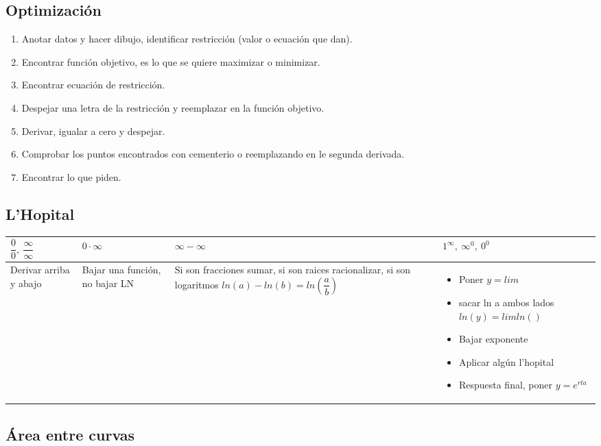\subsection{Optimización}

\begin{enumerate}
	\item Anotar datos y hacer dibujo, identificar restricción (valor o ecuación que dan).
	\item Encontrar función objetivo, es lo que se quiere maximizar o minimizar.
	\item Encontrar ecuación de restricción.
	\item Despejar una letra de la restricción y reemplazar en la función objetivo.
	\item Derivar, igualar a cero y despejar.
	\item Comprobar los puntos encontrados con cementerio o reemplazando en le segunda derivada.
	\item Encontrar lo que piden.
\end{enumerate}

\subsection{L'Hopital}

\begin{tabular}{@{}|p{2cm}| @{}|p{2cm}| @{}|p{2.5cm}| @{}|p{4cm}|}
	\hline \hline
	$\dfrac{0}{0},\ \dfrac{\infty}{\infty}$  & $0\cdot \infty$  & $\infty-\infty$ & $1^\infty,\ \infty^0,\ 0^0$ \\
	\hline
	Derivar arriba y abajo & Bajar una función, no bajar LN  & Si son fracciones sumar, si son raices racionalizar, si son logaritmos $ln(a)-ln(b)=ln(\dfrac{a}{b})$ & \begin{itemize}
		\item Poner $y=lim$
		\item sacar ln a ambos lados $ln(y)=lim ln()$
		\item Bajar exponente
		\item Aplicar algún l'hopital
		\item Respuesta final, poner $y=e^{rta}$
		\end{itemize}
	\\
	\hline
\end{tabular}

\subsection{Área entre curvas}

